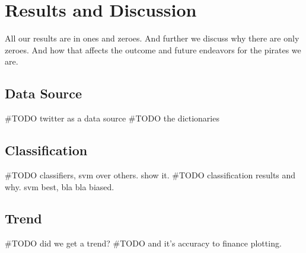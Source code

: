 \chapter{Results and Discussion}\label{results}
All our results are in ones and zeroes. 
And further we discuss why there are only zeroes. And how that affects the
outcome and future endeavors for the pirates we are. 

\section{Data Source}
#TODO twitter as a data source
#TODO the dictionaries

\section{Classification}
#TODO classifiers, svm over others. show it. 
#TODO classification results and why. svm best, bla bla biased. 

\section{Trend}
#TODO did we get a trend? 
#TODO and it's accuracy to finance plotting. 

